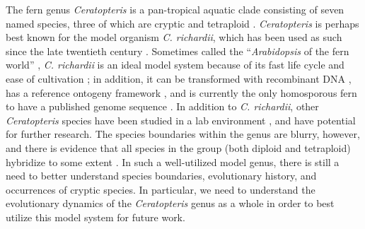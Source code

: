 \documentclass[12pt]{article}
\begin{document}
\begin{flushleft}
The fern genus \textit{Ceratopteris} is a pan-tropical aquatic clade consisting of seven named species, three of which are cryptic and tetraploid \autocite{PPGI, LloydTax1974, Masuyama2010}. \textit{Ceratopteris} is perhaps best known for the model organism \textit{C. richardii}, which has been used as such since the late twentieth century \autocite{Banks1994, hickock1987, Hickok1995}. Sometimes called the ``\textit{Arabidopsis} of the fern world'' \autocite{Sessa2014}, \textit{C. richardii} is an ideal model system because of its fast life cycle and ease of cultivation \autocite{hickock1987}; in addition, it can be transformed with recombinant DNA \autocite{Muthukumar2013, Plackett2014}, has a reference ontogeny framework \autocite{Conway2019-cd}, and is currently the only homosporous fern to have a published genome sequence \autocite{Marchant2019}. In addition to \textit{C. richardii}, other \textit{Ceratopteris} species have been studied in a lab environment \autocite{hickok1974, Hickok1977}, and have potential for further research. The species boundaries within the genus are blurry, however, and there is evidence that all species in the group (both diploid and tetraploid) hybridize to some extent \autocite{Adjie2007, hickok1974, Hickok1977, Hickok1979, LloydTax1974}. In such a well-utilized model genus, there is still a need to better understand species boundaries, evolutionary history, and occurrences of cryptic species. In particular, we need to understand the evolutionary dynamics of the \textit{Ceratopteris} genus as a whole in order to best utilize this model system for future work. 


\end{flushleft}
\end{document}
